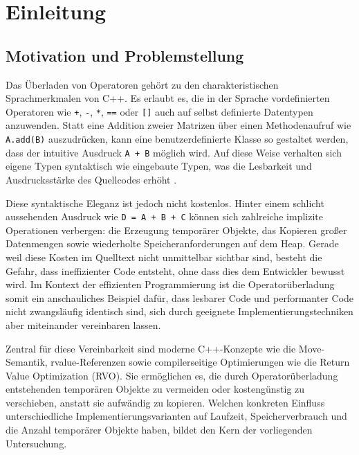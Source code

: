 \documentclass[10pt,a4paper]{article}
\begin{document}
\tableofcontents
\newpage

\setcounter{page}{1}

\section{Einleitung}
\label{sec:einleitung}

\subsection{Motivation und Problemstellung}

Das Überladen von Operatoren gehört zu den charakteristischen Sprachmerkmalen
von C++. Es erlaubt es, die in der Sprache vordefinierten Operatoren wie
\texttt{+}, \texttt{-}, \texttt{*}, \texttt{==} oder \texttt{[]} auch auf
selbst definierte Datentypen anzuwenden. Statt eine Addition zweier Matrizen
über einen Methodenaufruf wie \texttt{A.add(B)} auszudrücken, kann eine
benutzerdefinierte Klasse so gestaltet werden, dass der intuitive Ausdruck
\texttt{A + B} möglich wird. Auf diese Weise verhalten sich eigene Typen
syntaktisch wie eingebaute Typen, was die Lesbarkeit und Ausdrucksstärke des
Quellcodes erhöht \cite{stroustrup2013,cppreference}.

Diese syntaktische Eleganz ist jedoch nicht kostenlos. Hinter einem schlicht
aussehenden Ausdruck wie \texttt{D = A + B + C} können sich zahlreiche
implizite Operationen verbergen: die Erzeugung temporärer Objekte, das
Kopieren großer Datenmengen sowie wiederholte Speicheranforderungen auf dem
Heap. Gerade weil diese Kosten im Quelltext nicht unmittelbar sichtbar sind,
besteht die Gefahr, dass ineffizienter Code entsteht, ohne dass dies dem
Entwickler bewusst wird. Im Kontext der effizienten Programmierung ist die
Operatorüberladung somit ein anschauliches Beispiel dafür, dass lesbarer Code
und performanter Code nicht zwangsläufig identisch sind, sich durch geeignete
Implementierungstechniken aber miteinander vereinbaren lassen.

Zentral für diese Vereinbarkeit sind moderne C++-Konzepte wie die
Move-Semantik, rvalue-Referenzen sowie compilerseitige Optimierungen wie die
Return Value Optimization (RVO). Sie ermöglichen es, die durch
Operatorüberladung entstehenden temporären Objekte zu vermeiden oder
kostengünstig zu verschieben, anstatt sie aufwändig zu kopieren. Welchen
konkreten Einfluss unterschiedliche Implementierungsvarianten auf Laufzeit,
Speicherverbrauch und die Anzahl temporärer Objekte haben, bildet den Kern
der vorliegenden Untersuchung.
\end{document}
